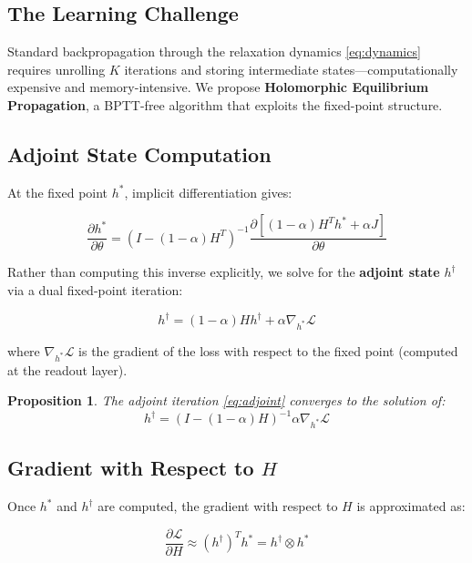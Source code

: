 \documentclass[11pt,a4paper]{article}
\newtheorem{proposition}[theorem]{Proposition}
\newcommand{\LL}{\mathcal{L}}
\begin{document}
\subsection{The Learning Challenge}

Standard backpropagation through the relaxation dynamics \eqref{eq:dynamics} requires unrolling $K$ iterations and storing intermediate states---computationally expensive and memory-intensive. We propose \textbf{Holomorphic Equilibrium Propagation}, a BPTT-free algorithm that exploits the fixed-point structure.

\subsection{Adjoint State Computation}

At the fixed point $h^*$, implicit differentiation gives:

\begin{equation}
\frac{\partial h^*}{\partial \theta} = (I - (1-\alpha)H^T)^{-1} \frac{\partial [(1-\alpha)H^T h^* + \alpha J]}{\partial \theta}
\end{equation}

Rather than computing this inverse explicitly, we solve for the \textbf{adjoint state} $h^\dagger$ via a dual fixed-point iteration:

\begin{equation}
\label{eq:adjoint}
h^\dagger = (1-\alpha)H h^\dagger + \alpha \nabla_{h^*}\LL
\end{equation}

where $\nabla_{h^*}\LL$ is the gradient of the loss with respect to the fixed point (computed at the readout layer).

\begin{proposition}
The adjoint iteration \eqref{eq:adjoint} converges to the solution of:
\begin{equation}
h^\dagger = (I - (1-\alpha)H)^{-1} \alpha \nabla_{h^*}\LL
\end{equation}
\end{proposition}

\subsection{Gradient with Respect to $H$}

Once $h^*$ and $h^\dagger$ are computed, the gradient with respect to $H$ is approximated as:

\begin{equation}
\frac{\partial \LL}{\partial H} \approx (h^\dagger)^T h^* = h^\dagger \otimes h^*
\end{equation}
\end{document}
